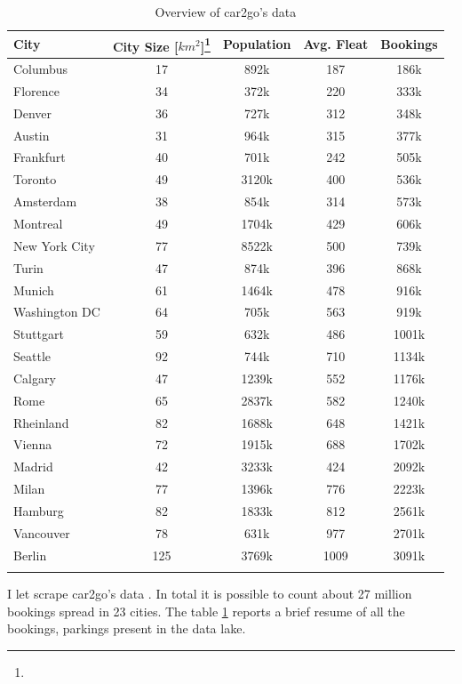 \begin{table}
	\setlength{\tabcolsep}{2.3pt}
	\centering
	\caption{Overview of car2go's data}
	\begin{tabular}{lcccc}
		\hline
		City &  City Size [$km^2$]\footnote{} & Population \footnotemark[\value{footnote}] &  Avg. Fleat & Bookings\\ 
		\hline
		\hline
		Columbus			  & 17 & 892k & 187 & 186k \\
		Florence 	  			& 34 & 372k & 220 & 333k \\
		Denver 		  			 & 36 & 727k & 312 & 348k \\
		Austin 		   			  & 31 & 964k & 315 & 377k \\
		Frankfurt 			   & 40 & 701k & 242 & 505k \\
		Toronto 				 & 49 & 3120k & 400 & 536k \\
		Amsterdam 			& 38 & 854k & 314 & 573k \\
		Montreal 				& 49 & 1704k & 429 & 606k \\
		New York City 	   & 77 & 8522k & 500 & 739k \\
		Turin 					    & 47 & 874k & 396 & 868k \\
		Munich 					 & 61 & 1464k & 478 & 916k \\
		Washington DC 	  & 64 & 705k & 563 & 919k \\
		Stuttgart 				 & 59 & 632k & 486 & 1001k \\
		Seattle 				   & 92 & 744k & 710 & 1134k \\
		Calgary 				  & 47 & 1239k & 552 & 1176k \\
		Rome 					  & 65 & 2837k & 582 & 1240k \\
		Rheinland 			   & 82 & 1688k & 648 & 1421k \\
		Vienna 					  & 72 & 1915k & 688 & 1702k \\
		Madrid 					 & 42 & 3233k & 424 & 2092k \\
		Milan 					   & 77 & 1396k & 776 & 2223k \\
		Hamburg 			  & 82 & 1833k & 812 & 2561k \\
		Vancouver 			 & 78 & 631k & 977 & 2701k \\
		Berlin 					  & 125 & 3769k & 1009 & 3091k \\
		\hline
		\label{tab:2_3_datasummary}
	\end{tabular}
\end{table}
I let \tool scrape car2go's data  . In total it is possible to count about 27 million bookings spread in 23 cities. The table \ref{tab:2_3_datasummary} reports a brief resume of all the bookings, parkings present in the data lake. 

